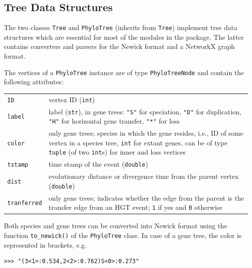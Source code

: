 \documentclass[hidelinks,11pt]{article}
\begin{document}
\subsection{Tree Data Structures}

The two classes \texttt{Tree} and \texttt{PhyloTree} (inherits from \texttt{Tree}) implement tree data structures which are essential for most of the modules in the package.
The latter contains converters and parsers for the Newick format and a NetworkX graph format.

The vertices of a \texttt{PhyloTree} instance are of type \texttt{PhyloTreeNode} and contain the following attributes:

\vspace{3mm}
\renewcommand{\arraystretch}{1.5}

{\small\centering
\begin{longtable}{ p{3.0cm} p{10cm} }
	\texttt{ID} & vertex ID (\texttt{int})\\
	\texttt{label}  & label (\texttt{str}), in gene trees: \texttt{"S"} for speciation, \texttt{"D"} for duplication, \texttt{"H"} for horizontal gene transfer, \texttt{"*"} for loss\\
	\texttt{color} & only gene trees; species in which the gene resides, i.e., ID of some vertex in a species tree, \texttt{int} for extant genes, can be of type \texttt{tuple} (of two \texttt{int}s) for inner and loss vertices\\
	\texttt{tstamp} & time stamp of the event (\texttt{double})\\
	\texttt{dist} & evolutionary distance or divergence time from the parent vertex (\texttt{double})\\
	\texttt{tranferred} & only gene trees; indicates whether the edge from the parent is the transfer edge from an HGT event; \texttt{1} if yes and \texttt{0} otherwise \\
\end{longtable}
}
\vspace{3mm}

Both species and gene trees can be converted into Newick format using the function \texttt{to\_newick()} of the \texttt{PhyloTree} class.
In case of a gene tree, the color is represented in brackets, e.g.

\begin{adjustwidth}{1cm}{1cm}\vspace{2mm}
\begin{verbatim}
>>> "(3<1>:0.534,2<2>:0.762)S<0>:0.273"
\end{verbatim}
\end{adjustwidth}
\end{document}
